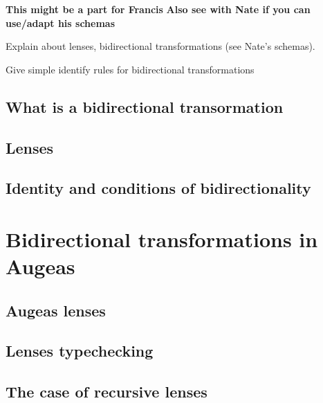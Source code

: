 \textbf{This might be a part for Francis}
\textbf{Also see with Nate if you can use/adapt his schemas}

Explain about lenses, bidirectional transformations (see Nate's schemas).

Give simple identify rules for bidirectional transformations

\subsection{What is a bidirectional transormation}


\subsection{Lenses}


\subsection{Identity and conditions of bidirectionality}



\section{Bidirectional transformations in Augeas}


\subsection{Augeas lenses}


\subsection{Lenses typechecking}


\subsection{The case of recursive lenses}


